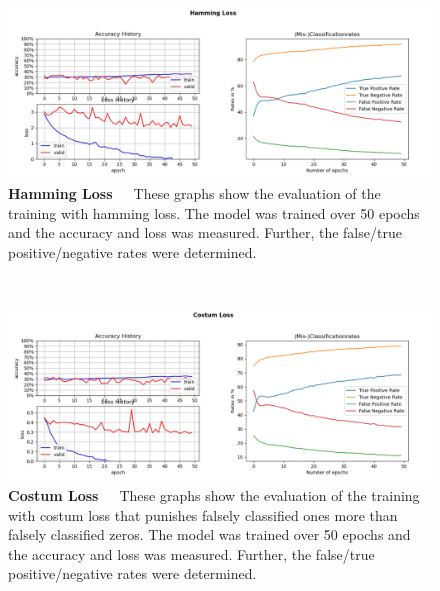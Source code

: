 \begin{figure}[h]
	\centering
	\includegraphics[scale=0.37]{Figures/chapter04/multilabel_hamming}
	\decoRule
	\caption[Hamming Loss]{\textbf{Hamming Loss}~~~These graphs show the evaluation of the training with hamming loss. The model was trained over 50 epochs and the accuracy and loss was measured. Further, the false/true positive/negative rates were determined.}
	\label{fig:MultilabelHammingLoss}
\end{figure}
\\
\begin{figure}[h]
	\centering
	\includegraphics[scale=0.37]{Figures/chapter04/multilabel_costum}
	\decoRule
	\caption[Costum Loss]{\textbf{Costum Loss}~~~These graphs show the evaluation of the training with costum loss that punishes falsely classified ones more than falsely classified zeros. The model was trained over 50 epochs and the accuracy and loss was measured. Further, the false/true positive/negative rates were determined.}
	\label{fig:MultilabelCostumLoss}
\end{figure}
\\
